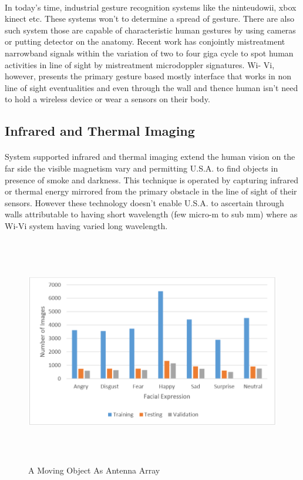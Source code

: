 \documentclass[a4paper,12pt,oneside]{article}
\begin{document}
\paragraph{}
In today’s time, industrial gesture recognition systems like the ninteudowii, xbox kinect
etc. These systems won’t to determine a spread of gesture. There are also such system those are
capable of characteristic human gestures by using cameras or putting detector on the anatomy.
Recent work has conjointly mistreatment narrowband signals within the variation of two to four
giga cycle to spot human activities in line of sight by mistreatment microdoppler signatures. Wi-
Vi, however, presents the primary gesture based mostly interface that works in non line of sight
eventualities and even through the wall and thence human isn't need to hold a wireless device or
wear a sensors on their body.
\subsection{Infrared and Thermal Imaging}
\paragraph{}
System supported infrared and thermal imaging extend the human vision on the far side
the visible magnetism vary and permitting U.S.A. to find objects in presence of smoke and
darkness. This technique is operated by capturing infrared or thermal energy mirrored from the
primary obstacle in the line of sight of their sensors. However these technology doesn't enable
U.S.A. to ascertain through walls attributable to having short wavelength (few micro-m to sub mm)
where as Wi-Vi system having varied long wavelength.

\begin{figure}[H]
\centering
\includegraphics[height=10cm,width=15cm]{4.PNG}
\caption{A Moving Object As Antenna Array}
\end{figure}
\end{document}
